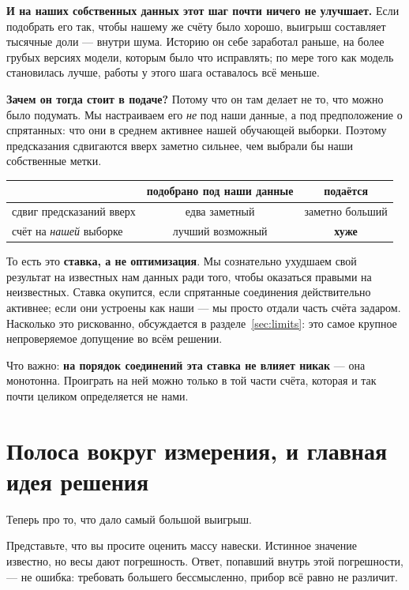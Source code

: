 \documentclass[11pt,a4paper]{article}
\begin{document}
\textbf{И на наших собственных данных этот шаг почти ничего не улучшает.} Если подобрать его
так, чтобы нашему же счёту было хорошо, выигрыш составляет тысячные доли --- внутри шума.
Историю он себе заработал раньше, на более грубых версиях модели, которым было что исправлять;
по мере того как модель становилась лучше, работы у этого шага оставалось всё меньше.

\textbf{Зачем он тогда стоит в подаче?} Потому что он там делает не то, что можно было
подумать. Мы настраиваем его \emph{не} под наши данные, а под предположение о спрятанных:
что они в среднем активнее нашей обучающей выборки. Поэтому предсказания сдвигаются вверх
заметно сильнее, чем выбрали бы наши собственные метки.

\begin{center}
\small
\begin{tabular}{lcc}
\toprule
 & подобрано под наши данные & \textbf{подаётся} \\
\midrule
сдвиг предсказаний вверх & едва заметный & заметно больший \\
счёт на \emph{нашей} выборке & лучший возможный & \textbf{хуже} \\
\bottomrule
\end{tabular}
\end{center}

То есть это \textbf{ставка, а не оптимизация}. Мы сознательно ухудшаем свой результат на
известных нам данных ради того, чтобы оказаться правыми на неизвестных. Ставка окупится, если
спрятанные соединения действительно активнее; если они устроены как наши --- мы просто отдали
часть счёта задаром. Насколько это рискованно, обсуждается в разделе~\ref{sec:limits}: это
самое крупное непроверяемое допущение во всём решении.

Что важно: \textbf{на порядок соединений эта ставка не влияет никак} --- она монотонна.
Проиграть на ней можно только в той части счёта, которая и так почти целиком определяется
не нами.

\section{Полоса вокруг измерения, и главная идея решения}

Теперь про то, что дало самый большой выигрыш.

Представьте, что вы просите оценить массу навески. Истинное значение известно, но весы дают
погрешность. Ответ, попавший внутрь этой погрешности, --- не ошибка: требовать большего
бессмысленно, прибор всё равно не различит.
\end{document}
